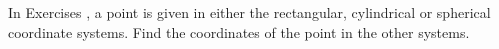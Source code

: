 {\noindent In Exercises} 
{,  a point is given in either the rectangular, cylindrical or spherical coordinate systems. Find the coordinates of the point in the other systems.
}
